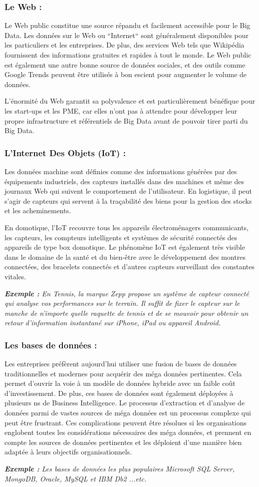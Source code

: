 \subsubsection{Le Web :}
Le Web public constitue une source répandu et facilement accessible pour le Big Data. Les données sur le Web ou “Internet“ sont généralement disponibles pour les particuliers et les entreprises. De plus, des services Web tels que Wikipédia fournissent des informations gratuites et rapides à tout le monde. Le Web public est également une autre bonne source de données sociales, et des outils comme Google Trends peuvent être utilisés à bon escient pour augmenter le volume de données.

L'énormité du Web garantit sa polyvalence et est particulièrement bénéfique pour les start-ups et les PME, car elles n'ont pas à attendre pour développer leur propre infrastructure et référentiels de Big Data avant de pouvoir tirer parti du Big Data.

\subsubsection{L'Internet Des Objets (IoT) :}
Les données machine sont définies comme des informations générées par des équipements industriels, des capteurs installés dans des machines et même des journaux Web qui suivent le comportement de l'utilisateur. En logistique, il peut s'agir de capteurs qui servent à la traçabilité des biens pour la gestion des stocks et les acheminements.

En domotique, l'IoT recouvre tous les appareils électroménagers communicants, les capteurs, les compteurs intelligents et systèmes de sécurité connectés des appareils de type box domotique. Le phénomène IoT est également très visible dans le domaine de la santé et du bien-être avec le développement des montres connectées, des bracelets connectés et d'autres capteurs surveillant des constantes vitales.

\textit{\textbf{Exemple :} En Tennis, la marque Zepp propose un système de capteur connecté qui analyse vos performances sur le terrain. Il suffit de fixer le capteur sur le manche de n'importe quelle raquette de tennis et de se mouvoir pour obtenir un retour d'information instantané sur iPhone, iPad ou appareil Android.}

\subsubsection{Les bases de données :}
Les entreprises préfèrent aujourd'hui utiliser une fusion de bases de données traditionnelles et modernes pour acquérir des méga données pertinentes. Cela permet d'ouvrir la voie à un modèle de données hybride avec un faible coût d'investissement. De plus, ces bases de données sont également déployées à plusieurs  ns de Business Intelligence. Le processus d'extraction et d'analyse de données parmi de vastes sources de méga données est un processus complexe qui peut être frustrant. Ces complications peuvent être résolues si les organisations englobent toutes les considérations nécessaires des méga données, et prennent en compte les sources de données pertinentes et les déploient d'une manière bien adaptée à leurs objectifs organisationnels.

\textit{\textbf{Exemple :} Les bases de données les plus populaires Microsoft SQL Server, MongoDB, Oracle, MySQL et IBM Db2 ...etc.}

\cite{noauthor_les_2016}